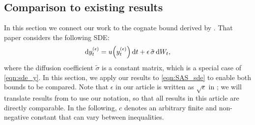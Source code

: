 \subsection{Comparison to existing results}
\label{sec:comparison}
In this section we connect our work to the cognate bound derived by \citet{Sanz-AlonsoStuart_2017_GaussianApproximationsSmall}.
That paper considers the following SDE:
\begin{equation}\label{eqn:SAS_sde}
	\dif y_t^{(\epsilon)} = u\!\left(y_t^{(\epsilon)}\right)\dif t + \epsilon \, \tilde{\sigma}\dif W_t,
\end{equation}
where the diffusion coefficient \(\tilde{\sigma}\) is a constant matrix, which is a special case of \cref{eqn:sde_y}.
In this section, we apply our results to \cref{eqn:SAS_sde} to enable both bounds to be compared.
Note that \(\epsilon\) in our article is written as \(\sqrt{\epsilon}\) in \citet{Sanz-AlonsoStuart_2017_GaussianApproximationsSmall}; we will translate results from \citet{Sanz-AlonsoStuart_2017_GaussianApproximationsSmall} to use our notation, so that all results in this article are directly comparable.
In the following, \(c\) denotes an arbitrary finite and non-negative constant that can vary between inequalities.

